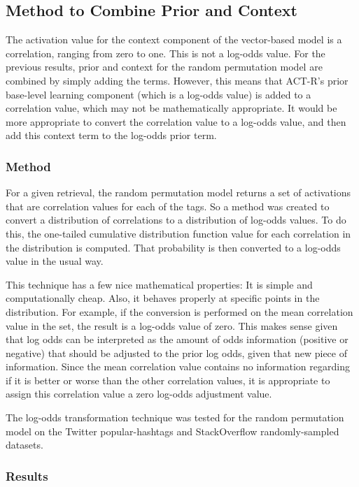 \documentclass[man,floatsintext,donotrepeattitle]{apa6}
\begin{document}
\subsection{Method to Combine Prior and Context}

The activation value for the context component of the vector-based model is a correlation, ranging from zero to one.
This is not a log-odds value.
For the previous results, prior and context for the random permutation model are combined by simply adding the terms.
However, this means that ACT-R's prior base-level learning component (which is a log-odds value) is added to a correlation value, which may not be mathematically appropriate.
It would be more appropriate to convert the correlation value to a log-odds value, and then add this context term to the log-odds prior term.

\subsubsection{Method}

For a given retrieval, the random permutation model returns a set of activations that are correlation values for each of the tags.
So a method was created to convert a distribution of correlations to a distribution of log-odds values.
To do this, the one-tailed cumulative distribution function value for each correlation in the distribution is computed.
That probability is then converted to a log-odds value in the usual way. 

This technique has a few nice mathematical properties:
It is simple and computationally cheap.
Also, it behaves properly at specific points in the distribution.
For example, if the conversion is performed on the mean correlation value in the set, the result is a log-odds value of zero.
This makes sense given that log odds can be interpreted as the amount of odds information (positive or negative) that should be adjusted to the prior log odds, given that new piece of information.
Since the mean correlation value contains no information regarding if it is better or worse than the other correlation values, it is appropriate to assign this correlation value a zero log-odds adjustment value.

The log-odds transformation technique was tested for the random permutation model on the Twitter popular-hashtags and StackOverflow randomly-sampled datasets.

\subsubsection{Results}
\end{document}
